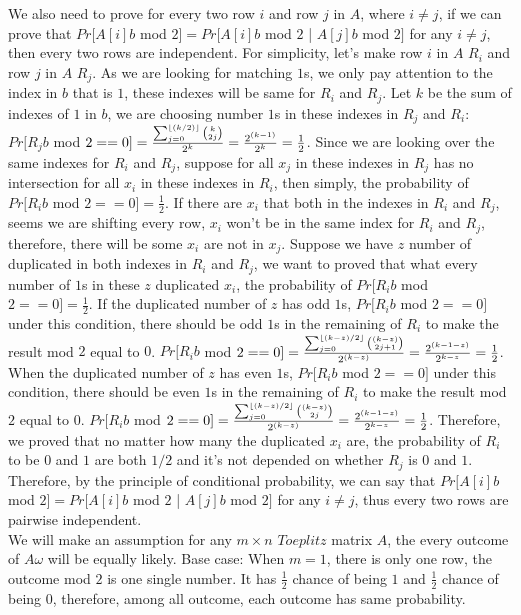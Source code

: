 \documentclass[11pt]{article}%
\begin{document}
\begin{questions}[1]
\begin{enumerate}[(a)]
    We also need to prove for every two row $i$ and row $j$ in $A$, where $i \neq j$, if we can prove that $Pr[A[i]b$ mod $2] = Pr[A[i]b$ mod $2$ | $A[j]b$ mod $2]$ for any $i \neq j$, then every two rows are independent. For simplicity, let's make row $i$ in $A$ $R_i$ and row $j$ in $A$ $R_j$. As we are looking for matching $1$s, we only pay attention to the index in $b$ that is $1$, these indexes will be same for $R_i$ and $R_j$. 
    Let $k$ be the sum of indexes of $1$ in $b$, we are choosing number $1$s in these indexes in $R_j$ and $R_i$:
    $Pr[R_jb$ mod $2 == 0] = \frac {\sum_{j=0}^{\lfloor (k/2) \rfloor}{k\choose 2j }}{2^k} = \frac{2^{(k-1)}}{2^k} = \frac{1}{2}$. Since we are looking over the same indexes for $R_i$ and $R_j$, suppose for all $x_j$ in these indexes in $R_j$ has no intersection for all $x_i$ in these indexes in $R_i$, then simply, the probability of $Pr[R_ib$ mod $2 == 0] = \frac{1}{2}$. If there are $x_i$ that both in the indexes in $R_i$ and $R_j$, seems we are shifting every row, $x_i$ won't be in the same index for $R_i$ and $R_j$, therefore, there will be some $x_i$ are not in $x_j$. Suppose we have $z$ number of duplicated in both indexes in $R_i$ and $R_j$, we want to proved that what every number of $1$s in these $z$ duplicated $x_i$, the probability of $Pr[R_ib$ mod $2 == 0] = \frac{1}{2}$. If the duplicated number of $z$ has odd $1$s, $Pr[R_ib$ mod $2 == 0]$ under this condition, there should be odd $1$s in the remaining of $R_i$ to make the result mod $2$ equal to $0$. $Pr[R_ib$ mod $2 == 0] = \frac {\sum_{j=0}^{\lfloor (k-z)/2 \rfloor}{(k-z)\choose 2j+1 }}{2^{(k-z)}} = \frac{2^{(k-1-z)}}{2^{k-z}} = \frac{1}{2}$. When the duplicated number of $z$ has even $1$s, $Pr[R_ib$ mod $2 == 0]$ under this condition, there should be even $1$s in the remaining of $R_i$ to make the result mod $2$ equal to $0$. $Pr[R_ib$ mod $2 == 0] = \frac {\sum_{j=0}^{\lfloor (k-z)/2 \rfloor}{(k-z)\choose 2j }}{2^{(k-z)}} = \frac{2^{(k-1-z)}}{2^{k-z}} = \frac{1}{2}$. Therefore, we proved that no matter how many the duplicated $x_i$ are, the probability of $R_i$ to be $0$ and $1$ are both $1/2$ and it's not depended on whether $R_j$ is $0$ and $1$. Therefore, by the principle of conditional probability, we can say that $Pr[A[i]b$ mod $2] = Pr[A[i]b$ mod $2$ | $A[j]b$ mod $2]$ for any $i \neq j$, thus every two rows are pairwise independent. 
    $$$$
    We will make an assumption for any $m \times n$ $Toeplitz$ matrix $A$, the every outcome of $A\omega$ will be equally likely.
    \newline
    Base case: When $m = 1$, there is only one row, the outcome mod $2$ is one single number. It has $\frac{1}{2}$ chance of being $1$ and $\frac{1}{2}$ chance of being $0$, therefore, among all outcome, each outcome has same probability.

\end{enumerate}
\end{questions}
\end{document}
